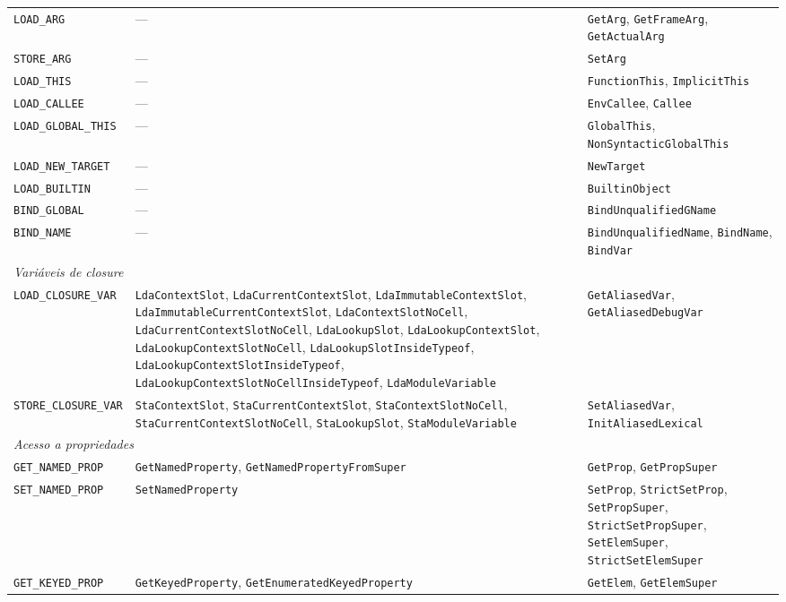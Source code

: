 {\begin{longtable}{@{}p{4.2cm}p{5.3cm}p{5.3cm}@{}}
\texttt{LOAD\_ARG} & --- & \texttt{GetArg}, \texttt{GetFrameArg}, \texttt{GetActualArg} \\
\texttt{STORE\_ARG} & --- & \texttt{SetArg} \\
\texttt{LOAD\_THIS} & --- & \texttt{FunctionThis}, \texttt{ImplicitThis} \\
\texttt{LOAD\_CALLEE} & --- & \texttt{EnvCallee}, \texttt{Callee} \\
\texttt{LOAD\_GLOBAL\_THIS} & --- & \texttt{GlobalThis}, \texttt{NonSyntacticGlobalThis} \\
\texttt{LOAD\_NEW\_TARGET} & --- & \texttt{NewTarget} \\
\texttt{LOAD\_BUILTIN} & --- & \texttt{BuiltinObject} \\
\texttt{BIND\_GLOBAL} & --- & \texttt{BindUnqualifiedGName} \\
\texttt{BIND\_NAME} & --- & \texttt{BindUnqualifiedName}, \texttt{BindName}, \texttt{BindVar} \\
\midrule
\multicolumn{3}{l}{\textit{Variáveis de closure}} \\
\midrule
\texttt{LOAD\_CLOSURE\_VAR} & \texttt{LdaContextSlot}, \texttt{LdaCurrentContextSlot}, \texttt{LdaImmutableContextSlot}, \texttt{LdaImmutableCurrentContextSlot}, \texttt{LdaContextSlotNoCell}, \texttt{LdaCurrentContextSlotNoCell}, \texttt{LdaLookupSlot}, \texttt{LdaLookupContextSlot}, \texttt{LdaLookupContextSlotNoCell}, \texttt{LdaLookupSlotInsideTypeof}, \texttt{LdaLookupContextSlotInsideTypeof}, \texttt{LdaLookupContextSlotNoCellInsideTypeof}, \texttt{LdaModuleVariable} & \texttt{GetAliasedVar}, \texttt{GetAliasedDebugVar} \\
\texttt{STORE\_CLOSURE\_VAR} & \texttt{StaContextSlot}, \texttt{StaCurrentContextSlot}, \texttt{StaContextSlotNoCell}, \texttt{StaCurrentContextSlotNoCell}, \texttt{StaLookupSlot}, \texttt{StaModuleVariable} & \texttt{SetAliasedVar}, \texttt{InitAliasedLexical} \\
\midrule
\multicolumn{3}{l}{\textit{Acesso a propriedades}} \\
\midrule
\texttt{GET\_NAMED\_PROP} & \texttt{GetNamedProperty}, \texttt{GetNamedPropertyFromSuper} & \texttt{GetProp}, \texttt{GetPropSuper} \\
\texttt{SET\_NAMED\_PROP} & \texttt{SetNamedProperty} & \texttt{SetProp}, \texttt{StrictSetProp}, \texttt{SetPropSuper}, \texttt{StrictSetPropSuper}, \texttt{SetElemSuper}, \texttt{StrictSetElemSuper} \\
\texttt{GET\_KEYED\_PROP} & \texttt{GetKeyedProperty}, \texttt{GetEnumeratedKeyedProperty} & \texttt{GetElem}, \texttt{GetElemSuper} \\

\end{longtable}}
